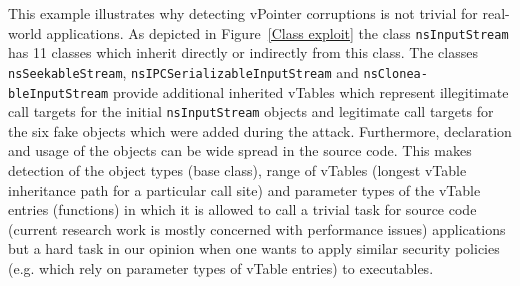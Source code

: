 This example illustrates why detecting vPointer corruptions is not trivial for real-world applications.
As depicted in Figure~\ref{Class exploit} the class \texttt{nsInputStream} has 11 classes which inherit directly
or indirectly from this class. The classes \texttt{nsSeekableStream}, \texttt{nsIPCSerializableInputStream}
and \texttt{nsClonea-\allowbreak bleInputStream} provide additional inherited vTables which represent illegitimate call targets
for the initial \texttt{nsInputStream} objects and legitimate call targets for the six fake objects which were added during the attack.
Furthermore, declaration and usage of the objects can be wide spread in the source code. This makes
detection of the object types (base class), range of vTables (longest vTable inheritance path for a particular call site)
and parameter types of the vTable entries (functions) in which it is allowed to call a 
trivial task for source code (current research work is mostly concerned with performance issues)
applications but a hard task in our opinion when one wants to apply similar security policies 
(e.g. which rely on parameter types of vTable entries) to executables.





